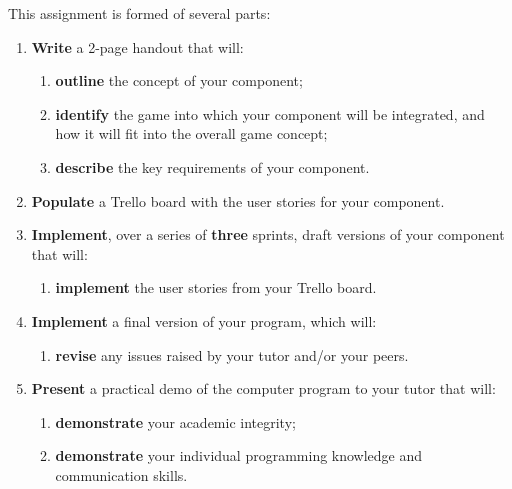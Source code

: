 \documentclass{../../fal_assignment}
\begin{document}

This assignment is formed of several parts:
\begin{enumerate}[label=(\Alph*)]
	\item \textbf{Write} a 2-page handout that will:
		\begin{enumerate}[label=(\roman*)]
			\item \textbf{outline} the concept of your component;
			\item \textbf{identify} the game into which your component will be integrated, and how it will fit into
				the overall game concept;
			\item \textbf{describe} the key requirements of your component.
		\end{enumerate}
	\item \textbf{Populate} a Trello board with the user stories for your component.
	\item \textbf{Implement}, over a series of \textbf{three} sprints, draft versions of your component that will:
		\begin{enumerate}[label=(\roman*)]
			\item \textbf{implement} the user stories from your Trello board.
		\end{enumerate}
	\item \textbf{Implement} a final version of your program, which will:
		\begin{enumerate}[label=(\roman*)]
			\item \textbf{revise} any issues raised by your tutor and/or your peers.
		\end{enumerate}
	\item \textbf{Present} a practical demo of the computer program to your tutor that will:
		\begin{enumerate}[label=(\roman*)]
			\item \textbf{demonstrate} your academic integrity;
			\item \textbf{demonstrate} your individual programming knowledge and communication skills.
		\end{enumerate}
\end{enumerate}
\end{document}
